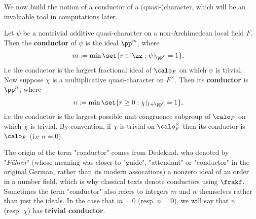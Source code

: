 \documentclass[11pt, x11names, openany]{book}
\begin{document}
We now build the notion of a conductor of a (quasi-)character, which will be an invaluable tool in computations later.

\begin{defn}
\label{def: conductor}
Let $\psi$ be a nontrivial additive quasi-character on a non-Archimedean local field $F$. Then the \textbf{conductor} of $\psi$ is the ideal $\pp^m$, where 
\begin{equation*}
    m := \min \set{r \in \zz : \psi \vert_{\pp^r} = 1},
\end{equation*}
i.e the conductor is the largest fractional ideal of $\calo_F$ on which $\psi$ is trivial.\\
Now suppose $\chi$ is a multiplicative quasi-character on $F^\times$. Then its \textbf{conductor} is $\pp^n$, where
\begin{equation*}
    n := \min \set{r \geq 0 : \chi \vert_{1 + \pp^r} = 1},
\end{equation*}
i.e the conductor is the largest possible unit congruence subgroup of $\calo_F$ on which $\chi$ is trivial. By convention, if $\chi$ is trivial on $\calo_F^\times$ then its conductor is $\calo_F$ (i.e $n = 0$).
\end{defn}

\begin{remark}[Terminology]
    The origin of the term "conductor" comes from Dedekind, who denoted by "\textit{F\"uhrer}" (whose meaning was closer to "guide", "attendant" or "conductor" in the original German, rather than its modern assocations) a nonzero ideal of an order in a number field, which is why classical texts denote conductors using $\frakf$. Sometimes the term "conductor" also refers to integers $m$ and $n$ themselves rather than just the ideals. In the case that $m = 0$ (resp. $n= 0$), we will say that $\psi$ (resp. $\chi$) has \textbf{trivial conductor}.
\end{remark}
\end{document}
